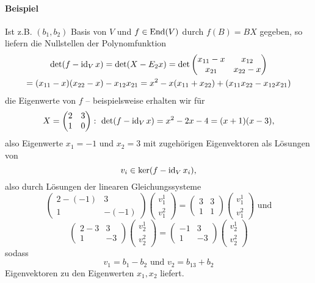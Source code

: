 \paragraph{Beispiel}	
	Ist z.B. $ (b_1,b_2) $ Basis von $ V $ und $ f\in \operatorname{End}(V) $ durch $ f(B)=BX $ gegeben, so liefern die Nullstellen der Polynomfunktion
		\begin{gather*}
		\det(f-\operatorname{id}_Vx) = \det(X-E_2 x)= \det \begin{pmatrix}
		x_{11}-x & x_{12}\\
		x_{21} & x_{22} -x
		\end{pmatrix}\\
	= (x_{11}-x)(x_{22}-x)-x_{12}x_{21}
	= x^2 - x(x_{11}+x_{22}) + (x_{11}x_{22}-x_{12}x_{21})
		\end{gather*}
	die Eigenwerte von $ f $ -- beispielsweise erhalten wir für
		\[ X = \begin{pmatrix} 2 &3\\1 & 0 \end{pmatrix}:\ 
			\det(f-\id_Vx) = x^2-2x-4 = (x+1)(x-3), \]
	also Eigenwerte $ x_1 = -1 $ und $ x_2 = 3 $ mit zugehörigen Eigenvektoren als Lösungen von
		\[ v_i \in \ker(f-\operatorname{id}_Vx_i), \]
	also durch Lösungen der linearen Gleichungssysteme
		\[ \begin{pmatrix}
		2-(-1) & 3\\ 1 & -(-1)
		\end{pmatrix}
		\begin{pmatrix}
		v_1^1\\v_1^2
		\end{pmatrix} = \begin{pmatrix}
		3 & 3\\ 1 & 1
		\end{pmatrix}
		\begin{pmatrix}
		v_1^1\\v_1^2
		\end{pmatrix} \text{ und} \]
		\[ \begin{pmatrix}
		2-3 & 3\\ 1 & -3
		\end{pmatrix}
		\begin{pmatrix}
		v_2^1\\v_2^2
		\end{pmatrix}=
		\begin{pmatrix}
		-1 & 3\\ 1 & -3
		\end{pmatrix}
		\begin{pmatrix}
		v_2^1\\v_2^2
		\end{pmatrix}  \]
	sodass
		\[ v_1 = b_1-b_2 \text{ und } v_2 = b_13+b_2 \]
	Eigenvektoren zu den Eigenwerten $ x_1,x_2 $ liefert.

